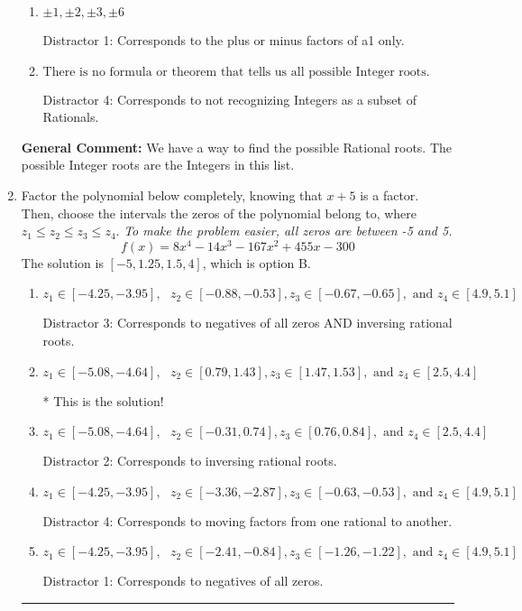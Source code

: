 \documentclass{extbook}[14pt]
\newcommand{\litem}[1]{\item #1

\rule{\textwidth}{0.4pt}}
\begin{document}
\begin{enumerate}
{\begin{enumerate}[label=\Alph*.]
This would have been the solution \textbf{if asked for the possible Rational roots}!
\item \( \pm 1,\pm 2,\pm 3,\pm 6 \)

 Distractor 1: Corresponds to the plus or minus factors of a1 only.
\item \( \text{There is no formula or theorem that tells us all possible Integer roots.} \)

 Distractor 4: Corresponds to not recognizing Integers as a subset of Rationals.
\end{enumerate}

\textbf{General Comment:} We have a way to find the possible Rational roots. The possible Integer roots are the Integers in this list.
}
\litem{
Factor the polynomial below completely, knowing that $x + 5$ is a factor. Then, choose the intervals the zeros of the polynomial belong to, where $z_1 \leq z_2 \leq z_3 \leq z_4$. \textit{To make the problem easier, all zeros are between -5 and 5.}
\[ f(x) = 8x^{4} -14 x^{3} -167 x^{2} +455 x -300 \]The solution is \( [-5, 1.25, 1.5, 4] \), which is option B.\begin{enumerate}[label=\Alph*.]
\item \( z_1 \in [-4.25, -3.95], \text{   }  z_2 \in [-0.88, -0.53], z_3 \in [-0.67, -0.65], \text{   and   } z_4 \in [4.9, 5.1] \)

 Distractor 3: Corresponds to negatives of all zeros AND inversing rational roots.
\item \( z_1 \in [-5.08, -4.64], \text{   }  z_2 \in [0.79, 1.43], z_3 \in [1.47, 1.53], \text{   and   } z_4 \in [2.5, 4.4] \)

* This is the solution!
\item \( z_1 \in [-5.08, -4.64], \text{   }  z_2 \in [-0.31, 0.74], z_3 \in [0.76, 0.84], \text{   and   } z_4 \in [2.5, 4.4] \)

 Distractor 2: Corresponds to inversing rational roots.
\item \( z_1 \in [-4.25, -3.95], \text{   }  z_2 \in [-3.36, -2.87], z_3 \in [-0.63, -0.53], \text{   and   } z_4 \in [4.9, 5.1] \)

 Distractor 4: Corresponds to moving factors from one rational to another.
\item \( z_1 \in [-4.25, -3.95], \text{   }  z_2 \in [-2.41, -0.84], z_3 \in [-1.26, -1.22], \text{   and   } z_4 \in [4.9, 5.1] \)

 Distractor 1: Corresponds to negatives of all zeros.
\end{enumerate}

}
\end{enumerate}
\end{document}
